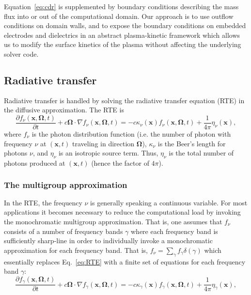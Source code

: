 \documentclass[3p]{elsarticle}
\def\bmx{\ensuremath{\bm{x}}}
\begin{document}
Equation~\eqref{eq:cdr} is supplemented by boundary conditions describing the mass flux into or out of the computational domain. Our approach is to use outflow conditions on domain walls, and to expose the boundary conditions on embedded electrodes and dielectrics in an abstract plasma-kinetic framework which allows us to modify the surface kinetics of the plasma without affecting the underlying solver code. 


\subsection{Radiative transfer}
\label{subsec:radiative_transfer}
Radiative transfer is handled by solving the radiative transfer equation (RTE) in the diffusive approximation. The RTE is
\begin{equation}
  \label{eq:RTE}
  \frac{\partial f_\nu\left(\bmx, \bm{\Omega}, t\right)}{\partial t} + c\bm{\Omega}\cdot\nabla f_\nu\left(\bmx, \bm{\Omega}, t\right) = -c\kappa_\nu(\bmx) f_\nu\left(\bmx, \bm{\Omega}, t\right) + \frac{1}{4\pi}\eta_\nu(\bmx),
\end{equation}
where $f_\nu$ is the photon distribution function (i.e. the number of photon with frequency $\nu$ at $(\bmx, t)$ traveling in direction $\bm{\Omega}$), $\kappa_\nu$ is the Beer's length for photons $\nu$, and $\eta_\nu$ is an isotropic source term. Thus, $\eta_\nu$ is the total number of photons produced at $(\bm{x},t)$ (hence the factor of $4\pi$).

\subsubsection{The multigroup approximation}
In the RTE, the frequency $\nu$ is generally speaking a continuous variable. For most applications it becomes necessary to reduce the computational load by invoking the monochromatic multigroup approximation. That is, one assumes that $f_\nu$ consists of a number of frequency bands $\gamma$ where each frequency band is sufficiently sharp-line in order to individually invoke a monochromatic approximation for each frequency band. That is, $f_\nu = \sum_\gamma f_\gamma\delta(\gamma)$ which essentially replaces Eq.~\eqref{eq:RTE} with a finite set of equations for each frequency band $\gamma$:
\begin{equation}
  \label{eq:multigroup}
  \frac{\partial f_\gamma\left(\bmx, \bm{\Omega}, t\right)}{\partial t} + c\bm{\Omega}\cdot\nabla f_\gamma\left(\bmx, \bm{\Omega}, t\right) = -c\kappa_\gamma(\bmx) f_\gamma\left(\bmx, \bm{\Omega}, t\right) + \frac{1}{4\pi}\eta_\gamma(\bmx),
\end{equation}
\end{document}
